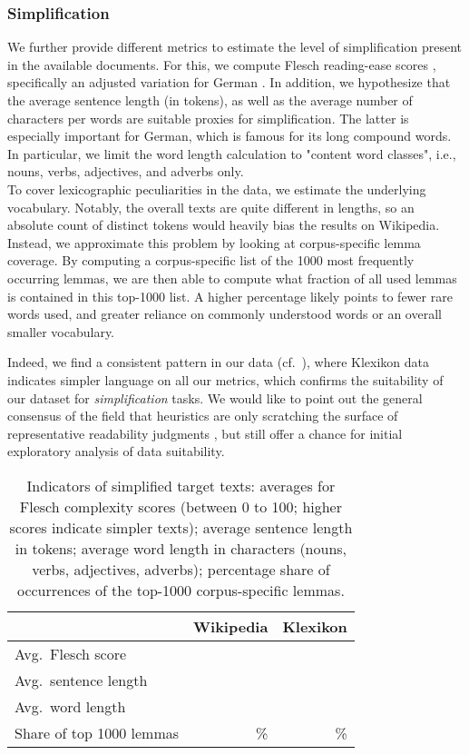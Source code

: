 \documentclass[10pt, a4paper]{article}
\begin{document}
\subsubsection{Simplification}

We further provide different metrics to estimate the level of simplification present in the available documents.
For this, we compute Flesch reading-ease scores \cite{flesch1948new}, specifically an adjusted variation for German \cite{amstad1978verstandlich}.
In addition, we hypothesize that the average sentence length (in tokens), as well as the average number of characters per words are suitable proxies for simplification.
The latter is especially important for German, which is famous for its long compound words. In particular, we limit the word length calculation to "content word classes", i.e., nouns, verbs, adjectives, and adverbs only. \\
To cover lexicographic peculiarities in the data, we estimate the underlying vocabulary.  Notably, the overall texts are quite different in lengths, so an absolute count of distinct tokens would heavily bias the results on Wikipedia.
Instead, we approximate this problem by looking at corpus-specific lemma coverage. By computing a corpus-specific list of the 1000 most frequently occurring lemmas, we are then able to compute what fraction of all used lemmas is contained in this top-1000 list.
A higher percentage likely points to fewer rare words used, and greater reliance on commonly understood words or an overall smaller vocabulary.

Indeed, we find a consistent pattern in our data (cf.~), where Klexikon data indicates simpler language on all our metrics,  which confirms the suitability of our dataset for \emph{simplification} tasks.
We would like to point out the general consensus of the field that heuristics are only scratching the surface of representative readability judgments \cite{chall1958readability}, but still offer a chance for initial exploratory analysis of data suitability.


\begin{table}[t]
	\centering
	\begin{tabular}{lr|r}
		\hline
		\textbf{} & \textbf{Wikipedia} & \textbf{Klexikon} \\
		\hline 
		Avg.~Flesch score &  &   \\
		Avg.~sentence length &  &  \\
		Avg.~word length &  &  \\
		Share of top 1000 lemmas & \% & \% \\
	\end{tabular}
	\caption{Indicators of simplified target texts: averages for Flesch complexity scores (between 0 to 100; higher scores indicate simpler texts); average sentence length in tokens; average word length in characters (nouns, verbs, adjectives, adverbs); percentage share of occurrences of the top-1000 corpus-specific lemmas.}
	\label{tab:simpler}
\end{table}
\end{document}
